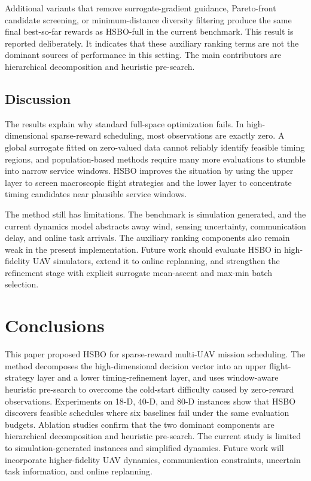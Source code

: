 \documentclass[twocolumn]{article}
\begin{document}
Additional variants that remove surrogate-gradient guidance, Pareto-front candidate screening, or minimum-distance diversity filtering produce the same final best-so-far rewards as HSBO-full in the current benchmark. This result is reported deliberately. It indicates that these auxiliary ranking terms are not the dominant sources of performance in this setting. The main contributors are hierarchical decomposition and heuristic pre-search.

\subsection{Discussion}
The results explain why standard full-space optimization fails. In high-dimensional sparse-reward scheduling, most observations are exactly zero. A global surrogate fitted on zero-valued data cannot reliably identify feasible timing regions, and population-based methods require many more evaluations to stumble into narrow service windows. HSBO improves the situation by using the upper layer to screen macroscopic flight strategies and the lower layer to concentrate timing candidates near plausible service windows.

The method still has limitations. The benchmark is simulation generated, and the current dynamics model abstracts away wind, sensing uncertainty, communication delay, and online task arrivals. The auxiliary ranking components also remain weak in the present implementation. Future work should evaluate HSBO in high-fidelity UAV simulators, extend it to online replanning, and strengthen the refinement stage with explicit surrogate mean-ascent and max-min batch selection.

\section{Conclusions}
This paper proposed HSBO for sparse-reward multi-UAV mission scheduling. The method decomposes the high-dimensional decision vector into an upper flight-strategy layer and a lower timing-refinement layer, and uses window-aware heuristic pre-search to overcome the cold-start difficulty caused by zero-reward observations. Experiments on 18-D, 40-D, and 80-D instances show that HSBO discovers feasible schedules where six baselines fail under the same evaluation budgets. Ablation studies confirm that the two dominant components are hierarchical decomposition and heuristic pre-search. The current study is limited to simulation-generated instances and simplified dynamics. Future work will incorporate higher-fidelity UAV dynamics, communication constraints, uncertain task information, and online replanning.
\end{document}
